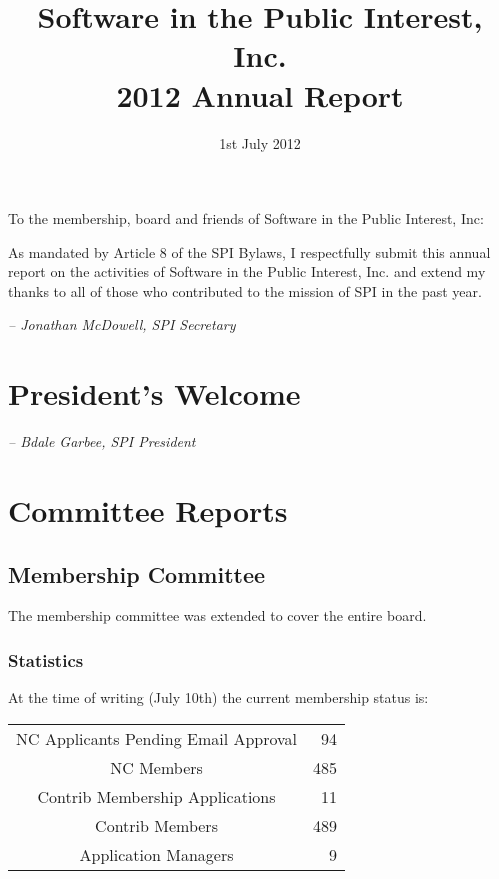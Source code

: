 \documentclass[letterpaper]{report}
\begin{document}
\title{Software in the Public Interest, Inc.\\
2012 Annual Report}
\date{1st July 2012}

\maketitle

To the membership, board and friends of Software in the Public Interest, Inc:

As mandated by Article 8 of the SPI Bylaws, I respectfully submit this annual
report on the activities of Software in the Public Interest, Inc. and extend my
thanks to all of those who contributed to the mission of SPI in the past year.

  \emph{-- Jonathan McDowell, SPI Secretary}

\newpage

\tableofcontents

\newpage

\chapter{President's Welcome}
\label{sec:president}

  \emph{-- Bdale Garbee, SPI President}

\chapter{Committee Reports}
\section{Membership Committee}

The membership committee was extended to cover the entire board.

\subsection{Statistics}

At the time of writing (July 10th) the current membership status is:

\begin{tabular}{ | c | r | }
\hline
NC Applicants Pending Email Approval	& 94 \\
NC Members				& 485 \\
Contrib Membership Applications		& 11 \\
Contrib Members				& 489 \\
Application Managers			& 9 \\
\hline
\end{tabular}
\end{document}
